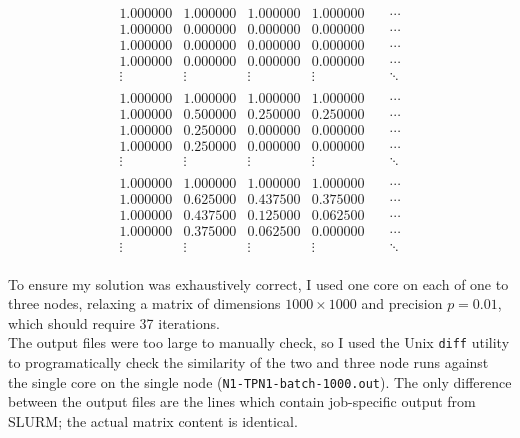 \documentclass[12pt]{article}
\begin{document}
\begin{minipage}{.45\textwidth}
$$
\begin{matrix}
1.000000 & 1.000000 & 1.000000 & 1.000000 & \quad\cdots \\
1.000000 & 0.000000 & 0.000000 & 0.000000 & \quad\cdots \\
1.000000 & 0.000000 & 0.000000 & 0.000000 & \quad\cdots \\
1.000000 & 0.000000 & 0.000000 & 0.000000 & \quad\cdots \\
\vdots & \vdots & \vdots & \vdots & \quad\ddots \\
\end{matrix}
$$
$$
\begin{matrix}
1.000000 & 1.000000 & 1.000000 & 1.000000 & \quad\cdots \\
1.000000 & 0.500000 & 0.250000 & 0.250000 & \quad\cdots \\
1.000000 & 0.250000 & 0.000000 & 0.000000 & \quad\cdots \\
1.000000 & 0.250000 & 0.000000 & 0.000000 & \quad\cdots \\
\vdots & \vdots & \vdots & \vdots & \quad\ddots \\
\end{matrix}
$$
$$
\begin{matrix}
1.000000 & 1.000000 & 1.000000 & 1.000000 & \quad\cdots \\
1.000000 & 0.625000 & 0.437500 & 0.375000 & \quad\cdots \\
1.000000 & 0.437500 & 0.125000 & 0.062500 & \quad\cdots \\
1.000000 & 0.375000 & 0.062500 & 0.000000 & \quad\cdots \\
\vdots & \vdots & \vdots & \vdots & \quad\ddots \\
\end{matrix}
$$

\end{minipage}\hspace{2cm}
\begin{minipage}{.42\textwidth}
	To ensure my solution was exhaustively correct, I used one core on each of one to three nodes, relaxing a matrix of dimensions $1000 \times{} 1000$ and precision $p=0.01$, which should require 37 iterations.\\
	
	The output files were too large to manually check, so I used the Unix \texttt{diff} utility to programatically check the similarity of the two and three node runs against the single core on the single node (\texttt{N1-TPN1-batch-1000.out}). The only difference between the output files are the lines which contain job-specific output from SLURM; the actual matrix content is identical.
\end{minipage}
\end{document}
